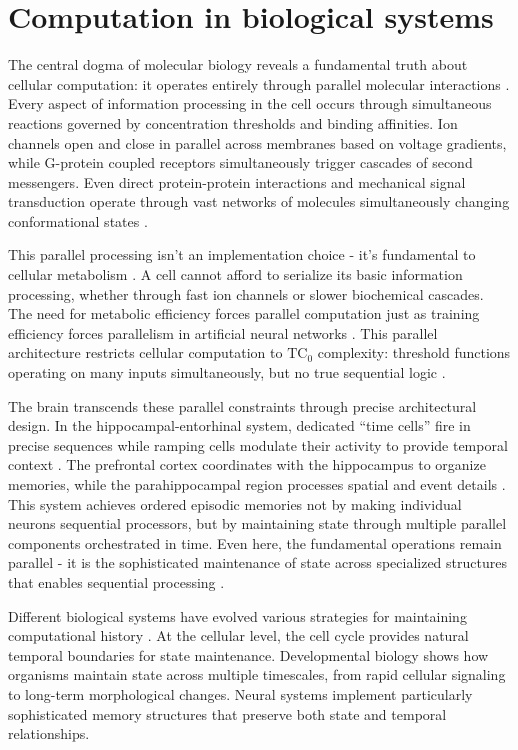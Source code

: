 \documentclass[12pt]{article}
\begin{document}
\section{Computation in biological systems}

The central dogma of molecular biology reveals a fundamental truth about cellular computation: it operates entirely through parallel molecular interactions \cite{wang2023parallel,cai2024efficient,fu2023scgrn}. Every aspect of information processing in the cell occurs through simultaneous reactions governed by concentration thresholds and binding affinities. Ion channels open and close in parallel across membranes based on voltage gradients, while G-protein coupled receptors simultaneously trigger cascades of second messengers. Even direct protein-protein interactions and mechanical signal transduction operate through vast networks of molecules simultaneously changing conformational states \cite{berridge2014cell}.

This parallel processing isn't an implementation choice - it's fundamental to cellular metabolism \cite{cai2024efficient,hoel2020emergence}. A cell cannot afford to serialize its basic information processing, whether through fast ion channels or slower biochemical cascades. The need for metabolic efficiency forces parallel computation just as training efficiency forces parallelism in artificial neural networks \cite{barrett2019analyzing}. This parallel architecture restricts cellular computation to $\text{TC}_0$ complexity: threshold functions operating on many inputs simultaneously, but no true sequential logic \cite{wang2023parallel}.

The brain transcends these parallel constraints through precise architectural design. In the hippocampal-entorhinal system, dedicated ``time cells'' fire in precise sequences while ramping cells modulate their activity to provide temporal context \cite{quentin2019differential}. The prefrontal cortex coordinates with the hippocampus to organize memories, while the parahippocampal region processes spatial and event details \cite{martini2015information}. This system achieves ordered episodic memories not by making individual neurons sequential processors, but by maintaining state through multiple parallel components orchestrated in time. Even here, the fundamental operations remain parallel - it is the sophisticated maintenance of state across specialized structures that enables sequential processing \cite{bruno2022epigenetic}.

Different biological systems have evolved various strategies for maintaining computational history \cite{espinosa2024molecular}. At the cellular level, the cell cycle provides natural temporal boundaries for state maintenance. Developmental biology shows how organisms maintain state across multiple timescales, from rapid cellular signaling to long-term morphological changes. Neural systems implement particularly sophisticated memory structures that preserve both state and temporal relationships.
\end{document}
